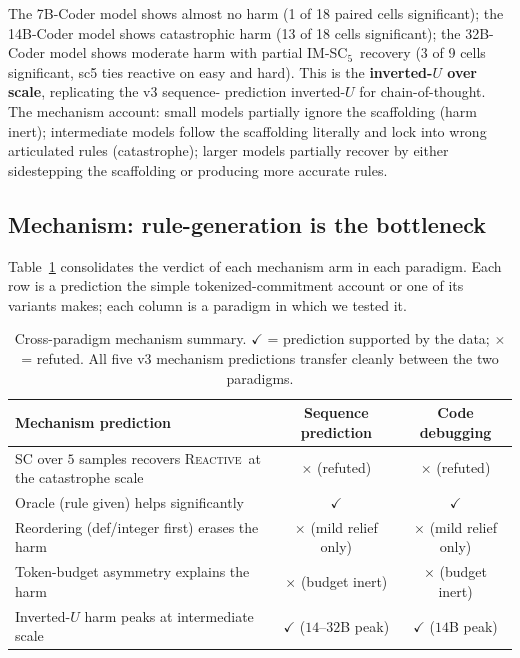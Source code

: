 \documentclass{article}
\newcommand{\reactive}{\textsc{Reactive}}
\newcommand{\imsc}{\textsc{IM-SC$_5$}}
\begin{document}
The 7B-Coder model shows almost no harm (1 of 18 paired cells
significant); the 14B-Coder model shows catastrophic harm
(13 of 18 cells significant); the 32B-Coder model shows
moderate harm with partial \imsc\ recovery (3 of 9 cells
significant, sc5 ties reactive on easy and hard).  This is the
\textbf{inverted-$U$ over scale}, replicating the v3 sequence-
prediction inverted-$U$ for chain-of-thought.  The mechanism
account: small models partially ignore the scaffolding (harm
inert); intermediate models follow the scaffolding literally
and lock into wrong articulated rules (catastrophe);
larger models partially recover by either sidestepping the
scaffolding or producing more accurate rules.

\subsection{Mechanism:  rule-generation is the bottleneck}

Table~\ref{tab:mech} consolidates the verdict of each
mechanism arm in each paradigm.  Each row is a prediction the
simple tokenized-commitment account or one of its variants
makes; each column is a paradigm in which we tested it.

\begin{table}[h]
\centering
\caption{Cross-paradigm mechanism summary.  $\checkmark$ =
prediction supported by the data; $\times$ = refuted.  All five
v3 mechanism predictions transfer cleanly between the two
paradigms.}
\label{tab:mech}
\small
\begin{tabularx}{\linewidth}{X c c}
\toprule
Mechanism prediction
  & Sequence prediction
  & Code debugging \\
\midrule
SC over $5$ samples recovers \reactive\ at the catastrophe scale
  & $\times$ (refuted)
  & $\times$ (refuted) \\
Oracle (rule given) helps significantly
  & $\checkmark$
  & $\checkmark$ \\
Reordering (def/integer first) erases the harm
  & $\times$ (mild relief only)
  & $\times$ (mild relief only) \\
Token-budget asymmetry explains the harm
  & $\times$ (budget inert)
  & $\times$ (budget inert) \\
Inverted-$U$ harm peaks at intermediate scale
  & $\checkmark$ ($14$--$32$B peak)
  & $\checkmark$ ($14$B peak) \\
\bottomrule
\end{tabularx}
\end{table}
\end{document}
